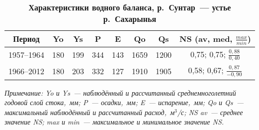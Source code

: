 
\begin{table}[H]
  \vspace{-8pt}
  \caption*{\textbf{Характеристики водного баланса, р.~Сунтар~--- устье р.~Сахарынья}}
    \vspace{-4pt}
  \label{tab:nesterova-1-tab}
  \vspace{-10pt}
  \begin{center}
  \begin{tabular}{cccccccc}
 \toprule
  Период    & Yo  & Ys  & P   & E   & Qo   & Qs   & NS 			(av, med, $\frac{max}{min}$)  \\[2pt]
 \midrule
  1957--1964 & 180 & 199 & 344 & 143 & 1659 & 1200 & 0,75; 			0,75; $\frac{0,88}{0,40}$  \\[6pt]
  1966--2012 & 180 & 203 & 332 & 127 & 1910 & 1905 & 0,58; 			0,67; $\frac{0,87}{-0,90}$ \\
\bottomrule
  \end{tabular}
\end{center}
  \vspace{-8pt}
\textit{Примечание: Yo и Ys~--- наблюдённый и рассчитанный среднемноголетний годовой слой стока,~мм; P~--- осадки,~мм; E~--- испарение,~мм; Qo и Qs~--- максимальный наблюдённый и рассчитанный расход,~м$^3$/с; NS av~--- среднее значение NS; max и min~--- максимальное и минимальное значение NS.}
  \vspace{-8pt}
\end{table}

